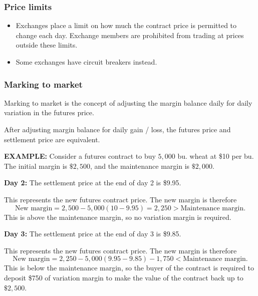 \documentclass[../notes_compiled.tex]{subfiles}
\begin{document}
\subsubsection*{Price limits}
\begin{itemize}
\item Exchanges place a limit on how much the contract price is permitted to change each day. Exchange members are prohibited from trading at prices outside these limits.
\item Some exchanges have circuit breakers instead.
\end{itemize}

\subsubsection*{Marking to market}
\begin{itemize}
\item Marking to market is the concept of adjusting the margin balance daily for daily variation in the futures price.
\item After adjusting margin balance for daily gain / loss, the futures price and settlement price are equivalent.
{\color{RedViolet}
\item[] \textbf{EXAMPLE:} Consider a futures contract to buy $5,000$ bu. wheat at \$10 per bu. The initial margin is $\$2,500$, and the maintenance margin is $\$2,000$.
\item[] \textbf{Day 2:} The settlement price at the end of day 2 is \$9.95.
}
{\color{RoyalBlue}
\item[] This represents the new futures contract price. The new margin is therefore
\begin{equation*}
\text{New margin} = 2,500 - 5,000(10-9.95) = 2,250>\text{Maintenance margin}.
\end{equation*}
This is above the maintenance margin, so no variation margin is required.
}
{\color{RedViolet}
\item[] \textbf{Day 3:} The settlement price at the end of day 3 is \$9.85.
}
{\color{RoyalBlue}
\item[] This represents the new futures contract price. The new margin is therefore
\begin{equation*}
\text{New margin} = 2,250 - 5,000(9.95-9.85) - 1,750<\text{Maintenance margin}.
\end{equation*}
This is below the maintenance margin, so the buyer of the contract is required to deposit \$750 of variation margin to make the value of the contract back up to $\$2,500$.
}
\end{itemize}
\end{document}
